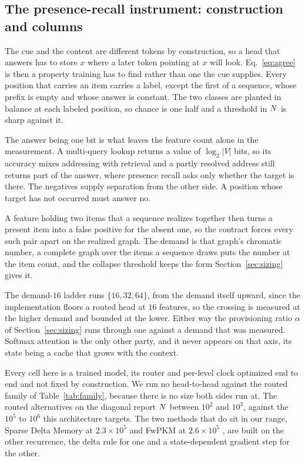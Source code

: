 \subsection{The presence-recall instrument: construction and columns}
\label{apd:presence}

The cue and the content are different tokens by construction, so a head that answers has to store $x$ where a later token pointing at $x$ will look. Eq.~\eqref{eq:agree} is then a property training has to find rather than one the cue supplies. Every position that carries an item carries a label, except the first of a sequence, whose prefix is empty and whose answer is constant. The two classes are planted in balance at each labeled position, so chance is one half and a threshold in $N$ is sharp against it.

The answer being one bit is what leaves the feature count alone in the measurement. A multi-query lookup returns a value of $\log_2 |V|$ bits, so its accuracy mixes addressing with retrieval and a partly resolved address still returns part of the answer, where presence recall asks only whether the target is there. The negatives supply separation from the other side. A position whose target has not occurred must answer no.

A feature holding two items that a sequence realizes together then turns a present item into a false positive for the absent one, so the contract forces every such pair apart on the realized graph. The demand is that graph's chromatic number, a complete graph over the items a sequence draws puts the number at the item count, and the collapse threshold keeps the form Section~\ref{sec:sizing} gives it.

The demand-$16$ ladder runs $\{16, 32, 64\}$, from the demand itself upward, since the implementation floors a routed head at $16$ features, so the crossing is measured at the higher demand and bounded at the lower. Either way the provisioning ratio $\alpha$ of Section~\ref{sec:sizing} runs through one against a demand that was measured. Softmax attention is the only other party, and it never appears on that axis, its state being a cache that grows with the context.

Every cell here is a trained model, its router and per-level clock optimized end to end and not fixed by construction. We run no head-to-head against the routed family of Table~\ref{tab:family}, because there is no size both sides run at. The routed alternatives on the diagonal report $N$ between $10^2$ and $10^3$, against the $10^5$ to $10^6$ this architecture targets. The two methods that do sit in our range, Sparse Delta Memory at $2.3 \times 10^5$ \citep{cabannes2026sdm} and FwPKM at $2.6 \times 10^5$ \citep{zhao2026fwpkm}, are built on the other recurrence, the delta rule for one and a state-dependent gradient step for the other.

